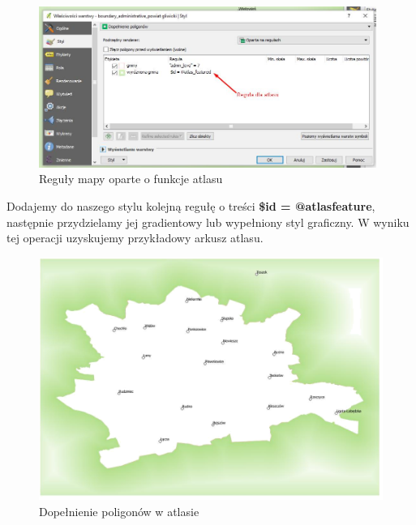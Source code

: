 \documentclass[12pt,a4paper]{book}
\begin{document}
\begin{figure}
	\centering
	\includegraphics[width=11.0cm]{008-atlas-reguly.jpg}
	\caption{Reguły mapy oparte o funkcje atlasu}
\end{figure}
Dodajemy do naszego stylu kolejną regułę o treści \textbf{\$id = @atlasfeature},  następnie przydzielamy jej gradientowy lub wypełniony styl graficzny. W wyniku tej operacji uzyskujemy przykładowy arkusz atlasu.
\begin{figure}[ht]
	\centering
	\includegraphics[scale=0.35]{008-atlas-dopelnienie.png}
	\caption{Dopełnienie poligonów w atlasie}
\end{figure}
\end{document}
